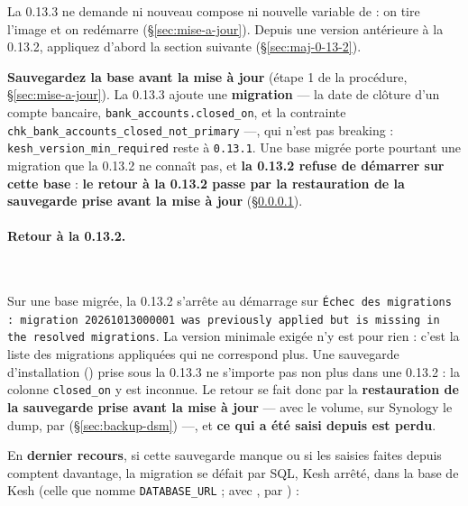 \documentclass[a4paper,11pt,oneside]{article}
\begin{document}
La 0.13.3 ne demande ni nouveau compose ni nouvelle variable de  : on tire l'image et on redémarre (\S\ref{sec:mise-a-jour}). Depuis une version antérieure à la 0.13.2, appliquez d'abord la section suivante (\S\ref{sec:maj-0-13-2}).

\begin{sloppypar}
\textbf{Sauvegardez la base avant la mise à jour} (étape 1 de la procédure, \S\ref{sec:mise-a-jour}). La 0.13.3 ajoute une \textbf{migration} --- la date de clôture d'un compte bancaire, \texttt{bank\_accounts.closed\_on}, et la contrainte \texttt{chk\_bank\_accounts\_closed\_not\_primary} ---, qui n'est pas breaking : \texttt{kesh\_version\_min\_required} reste à \texttt{0.13.1}. Une base migrée porte pourtant une migration que la 0.13.2 ne connaît pas, et \textbf{la 0.13.2 refuse de démarrer sur cette base} : \textbf{le retour à la 0.13.2 passe par la restauration de la sauvegarde prise avant la mise à jour} (\S\ref{sec:maj-0-13-3-retour}).
\end{sloppypar}

\paragraph{Retour à la 0.13.2.}\label{sec:maj-0-13-3-retour}\mbox{}\\
\begin{sloppypar}
Sur une base migrée, la 0.13.2 s'arrête au démarrage sur \texttt{Échec des migrations : migration 20261013000001 was previously applied but is missing in the resolved migrations}. La version minimale exigée n'y est pour rien : c'est la liste des migrations appliquées qui ne correspond plus. Une sauvegarde d'installation () prise sous la 0.13.3 ne s'importe pas non plus dans une 0.13.2 : la colonne \texttt{closed\_on} y est inconnue. Le retour se fait donc par la \textbf{restauration de la sauvegarde prise avant la mise à jour} --- avec  le volume, sur Synology le dump, par  (\S\ref{sec:backup-dsm}) ---, et \textbf{ce qui a été saisi depuis est perdu}.
\end{sloppypar}

\begin{sloppypar}
En \textbf{dernier recours}, si cette sauvegarde manque ou si les saisies faites depuis comptent davantage, la migration se défait par SQL, Kesh arrêté, dans la base de Kesh (celle que nomme \texttt{DATABASE\_URL} ; avec , par ) :
\end{sloppypar}
\end{document}

